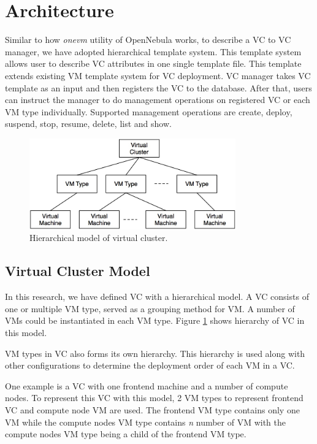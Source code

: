 \documentclass[conference]{IEEEtran}
\begin{document}
\section{Architecture}
Similar to how \emph{onevm} utility of OpenNebula works, to describe a VC to VC manager, we have adopted hierarchical template system.
This template system allows user to describe VC attributes in one single template file.
This template extends existing VM template system for VC deployment.
VC manager takes VC template as an input and then registers the VC to the database.
After that, users can instruct the manager to do management operations on registered VC or each VM type individually.
Supported management operations are create, deploy, suspend, stop, resume, delete, list and show.

\begin{figure}[!t]
\centering
\includegraphics[width=3.5in]{model}
\caption{Hierarchical model of virtual cluster.}
\label{fig:model}
\end{figure}

\subsection{Virtual Cluster Model}
In this research, we have defined VC with a hierarchical model.
A VC consists of one or multiple VM type, served as a grouping method for VM.
A number of VMs could be instantiated in each VM type.
Figure \ref{fig:model} shows hierarchy of VC in this model.

VM types in VC also forms its own hierarchy.
This hierarchy is used along with other configurations to determine the deployment order of each VM in a VC.

One example is a VC with one frontend machine and a number of compute nodes.
To represent this VC with this model, 2 VM types to represent frontend VC and compute node VM are used.
The frontend VM type contains only one VM while the compute nodes VM type contains \emph{n} number of VM with the compute nodes VM type being a child of the frontend VM type.
\end{document}
